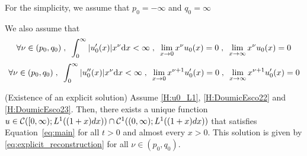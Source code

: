 \documentclass[11pt]{amsart}
\begin{document}
For the simplicity, we assume that 
$ p_0=-\infty$ and $q_0 = \infty$

We also assume that 
\begin{equation}
    \forall \nu \in (p_0, q_0) 
    \; , \enspace
    \int_0^\infty |u_0'(x)| x^\nu \mathrm dx < \infty
    \; , \enspace
    \lim_{x \to 0} x^\nu u_0(x) = 0
    \; , \enspace
    \lim_{x \to \infty} x^\nu u_0(x) = 0
    \label{H:DoumicEsco22}
\end{equation}
\begin{equation}
    \forall \nu \in (p_0, q_0) 
    \; , \enspace
    \int_0^\infty |u_0''(x)| x^\nu \mathrm dx < \infty
    \; , \enspace
    \lim_{x \to 0} x^{\nu + 1} u_0'(x) = 0
    \; , \enspace
    \lim_{x \to \infty} x^{\nu + 1} u_0'(x) = 0
    \label{H:DoumicEsco23}
\end{equation}

\begin{theorem}(Existence of an explicit solution) Assume \eqref{H:u0_L1}, \eqref{H:DoumicEsco22} and \eqref{H:DoumicEsco23}.
    Then, there exists a unique function $u \in \mathcal{C}([0, \infty); L^1((1+x)dx)) \cap \mathcal{C}^1((0, \infty); L^1((1+x)dx))$ that satisfies Equation~\eqref{eq:main} for all $t > 0$ and almost every $x > 0$. This solution is given by \eqref{eq:explicit_reconstruction} for all $\nu \in (p_0, q_0)$.
    \end{theorem}
\end{document}
